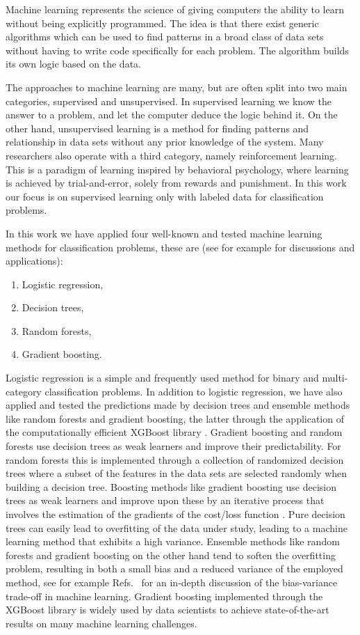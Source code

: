 \documentclass[superscriptaddress,unsortedaddress,
 amsmath,amssymb,
 aps,
]{revtex4-2}
\begin{document}
Machine learning represents the science of giving computers the ability to learn without being explicitly programmed. The idea is that there exist generic algorithms which can be used to find patterns in a broad class of data sets without having to write code specifically for each problem. The algorithm builds its own logic based on the data. 

The approaches to machine learning are many, but are often split into two main categories, supervised and unsupervised. In supervised learning we know the answer to a problem, and let the computer deduce the logic behind it. On the other hand, unsupervised learning is a method for finding patterns and relationship in data sets without any prior knowledge of the system. Many researchers also operate with a third category, namely reinforcement learning. This is a paradigm of learning inspired by behavioral psychology, where learning is achieved by trial-and-error, solely from rewards and punishment. In this work our focus is on supervised learning only with labeled data for classification problems.

In this work we have applied four well-known and tested machine learning methods for classification problems, these are (see for example \cite{Hastie2009,Mehta2019} for discussions and applications):
\begin{enumerate}
    \item Logistic regression,
    \item Decision trees,
    \item Random forests,
    \item Gradient boosting.
\end{enumerate}
Logistic regression \cite{Hastie2009} is a simple and frequently used method for binary and multi-category classification problems. In addition to logistic regression, we have also applied and tested the predictions made by decision trees and ensemble methods like random forests and gradient boosting, the latter through the application of the computationally efficient  XGBoost library \cite{xgboost2016}. Gradient boosting and random forests use decision trees as weak learners and improve their predictability. For random forests this is implemented through a collection of randomized decision trees where a  subset of the features in the data sets are selected randomly when building a decision tree. Boosting methods like gradient boosting use decision trees as  weak learners and improve upon these by an iterative process that involves the estimation of the gradients of the cost/loss function \cite{Hastie2009}. Pure decision trees can easily lead to overfitting of the data under study, leading to a machine learning method that exhibits a high variance. Ensemble methods like random forests and gradient boosting on the other hand tend to soften the overfitting problem, resulting in both a small bias and a reduced variance of the employed method, see for example Refs.~\cite{Hastie2009,Mehta2019} for an in-depth discussion of the bias-variance trade-off in machine learning. Gradient boosting implemented through the  XGBoost library \cite{xgboost2016} is widely used by data scientists to achieve state-of-the-art results on many machine learning challenges. 
\end{document}
